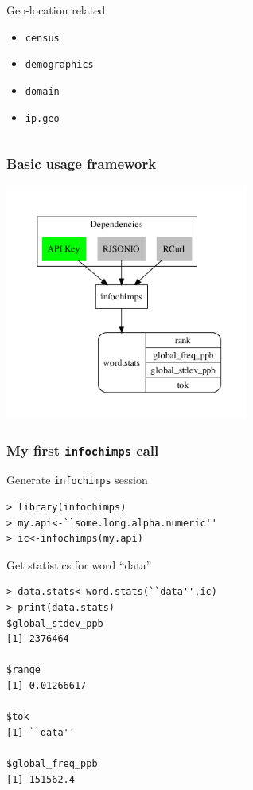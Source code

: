 \documentclass[xcolor=dvipsnames, 9pt]{beamer}
\begin{document}
\begin{frame}[fragile]
{\begin{columns}
                \begin{block}{Geo-location related}
                    \begin{itemize}
                        \item \texttt{census}
                        \item \texttt{demographics}
                        \item \texttt{domain}
                        \item \texttt{ip.geo}
                    \end{itemize}
                \end{block}
                \vspace{8.5mm}
        \end{columns}}
\end{frame}

\begin{frame}[fragile]
    \frametitle{Basic usage framework}
    \begin{center}
        \includegraphics[width=8cm]{images/struct.pdf}
    \end{center}
\end{frame}

\begin{frame}[fragile]
    \frametitle{My first \texttt{infochimps} call}
    \alert<1>{Generate \texttt{infochimps} session}
    \begin{lstlisting}
> library(infochimps)
> my.api<-``some.long.alpha.numeric''
> ic<-infochimps(my.api)
    \end{lstlisting}
    \alert<2>{Get statistics for word ``data''}
    \begin{lstlisting}
> data.stats<-word.stats(``data'',ic)
> print(data.stats)
$global_stdev_ppb
[1] 2376464

$range
[1] 0.01266617

$tok
[1] ``data''

$global_freq_ppb
[1] 151562.4
    \end{lstlisting}
\end{frame}
\end{document}

